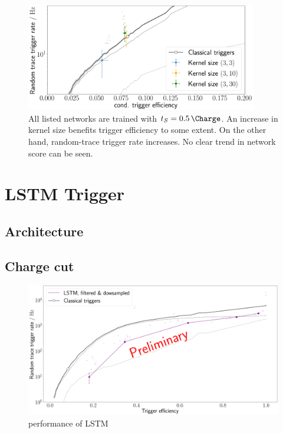 \begin{figure}
	\centering
	\includegraphics[width=0.9\textwidth]{./plots/CNN_kernel_size.png}
	\caption{All listed networks are trained with $t_S = \SI{0.5}{\Charge}$. An increase in kernel size benefits trigger efficiency to some extent. On the other
	hand, random-trace trigger rate increases. No clear trend in network score can be seen.}
	\label{fig:CNN-kernel-size}
\end{figure}


























\section{LSTM Trigger}
\label{sec:lstm-performance}

\subsection{Architecture}
\label{ssec:lstm-architecture}



\subsection{Charge cut}
\label{ssec:cnn-charge-cut}

\begin{figure}
	\centering
	\includegraphics[width=1\textwidth]{./plots/prelim/LSTM.png}
	\caption{performance of LSTM}
\end{figure}









